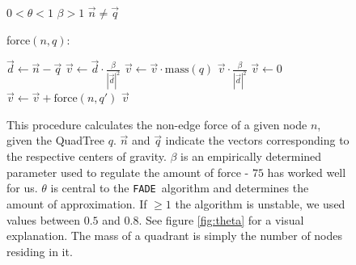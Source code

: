 \documentclass[a4paper,11pt,titlepage]{article}
\newcommand{\FADE}{\texttt{FADE}\ }
\begin{document}
\begin{figure}[ht]
  \begin{minipage}[b]{0.5\linewidth}
    \begin{algorithmic}
      \REQUIRE \(0 < \theta < 1\)
      \REQUIRE \(\beta > 1\)
      \REQUIRE \(\vec{n} \neq \vec{q}\)
    \end{algorithmic}
    force\((n, q)\):
    \begin{algorithmic}
      \STATE \(\vec{d} \gets \vec{n} - \vec{q}\)
      \STATE \(\vec{v} \gets \vec{d} \cdot \frac{\beta}{|{\vec{d}}|^2}\)
      \STATE \(\vec{v} \gets \vec{v} \cdot \textrm{mass}(q)\)
      \RETURN \(\vec{v} \cdot \frac{\beta}{|{\vec{d}}|^2}\)
      \ELSE
      \STATE \(\vec{v} \gets 0\)
      \STATE \(\vec{v} \gets \vec{v} + \textrm{force}(n, q')\)
      \ENDFOR
      \RETURN \(\vec{v}\)
      \ENDIF
    \end{algorithmic}
    \caption{This procedure calculates the non-edge force of a given
      node \(n\), given the QuadTree \(q\). \(\vec{n}\) and
      \(\vec{q}\) indicate the vectors corresponding to the respective
      centers of gravity. \(\beta\) is an empirically determined
      parameter used to regulate the amount of force - \(75\) has
      worked well for us. \(\theta\) is central to the \FADE algorithm
      and determines the amount of approximation. If \(\geq 1\) the
      algorithm is unstable, we used values between \(0.5\) and
      \(0.8\). See figure \ref{fig:theta} for a visual
      explanation. The mass of a quadrant is simply the number of
      nodes residing in it. }
    \label{proc:FADE}
  \end{minipage}
  \hspace{10pt}
  \begin{minipage}[b]{0.5\linewidth}
    \centering
\end{minipage}
\end{figure}
\end{document}
